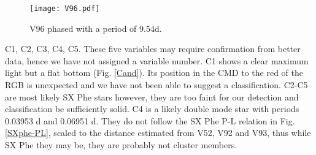 \documentclass[journal]{rmaa}
\newcommand{\1}{\'{\i}}
\begin{document}
\begin{figure}
\begin{center}
\texttt{[image: V96.pdf]}
\caption{V96 phased with a period of 9.54d.}
\label{V96}
\end{center}
\end{figure}

C1, C2, C3, C4, C5. These five variables may require confirmation from better data,
hence we
have not assigned a variable number. C1 shows a clear maximum light but a flat bottom
(Fig. \ref{Cand}). Its position in the CMD to the red of the RGB is unexpected and we
have not been able to suggest a classification. C2-C5 are most likely SX Phe
stars however, they are too faint for our detection and classification be
sufficiently solid. C4 is a likely double mode star with periods 0.03953 d and 0.06951
d. They do not follow the SX Phe P-L relation in Fig. \ref{SXphe-PL}, scaled to the
distance estimated from V52, V92 and V93, thus while SX Phe they may be, they are
probably not
cluster members.
\end{document}
